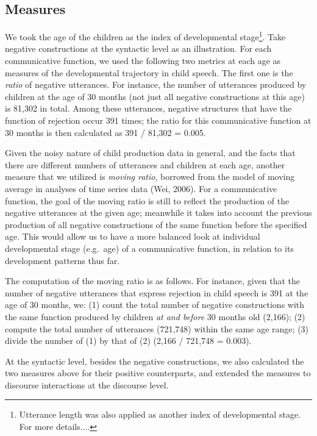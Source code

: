\documentclass[
  english,
  man,floatsintext]{apa6}
\begin{document}
\hypertarget{measures}{%
\subsection{Measures}\label{measures}}

We took the age of the children as the index of developmental stage\footnote{Utterance length was also applied as another index of developmental stage. For more details....}. Take negative constructions at the syntactic level as an illustration. For each communicative function, we used the following two metrics at each age as measures of the developmental trajectory in child speech. The first one is the \emph{ratio} of negative utterances. For instance, the number of utterances produced by children at the age of 30 months (not just all negative constructions at this age) is 81,302 in total. Among these utterances, negative structures that have the function of rejection occur 391 times; the ratio for this communicative function at 30 months is then calculated as 391 / 81,302 = 0.005.

Given the noisy nature of child production data in general, and the facts that there are different numbers of utterances and children at each age, another measure that we utilized is \emph{moving ratio}, borrowed from the model of moving average in analyses of time series data (Wei, 2006). For a communicative function, the goal of the moving ratio is still to reflect the production of the negative utterances at the given age; meanwhile it takes into account the previous production of all negative constructions of the same function before the specified age. This would allow us to have a more balanced look at individual developmental stage (e.g.~age) of a communicative function, in relation to its development patterns thus far.

The computation of the moving ratio is as follows. For instance, given that the number of negative utterances that express rejection in child speech is 391 at the age of 30 months, we: (1) count the total number of negative constructions with the same function produced by children \emph{at and before} 30 months old (2,166); (2) compute the total number of utterances (721,748) within the same age range; (3) divide the number of (1) by that of (2) (2,166 / 721,748 = 0.003).

At the syntactic level, besides the negative constructions, we also calculated the two measures above for their positive counterparts, and extended the measures to discourse interactions at the discourse level.
\end{document}
